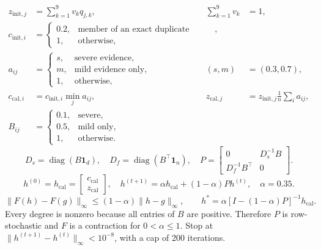 \begin{align}
 z_{\mathrm{init},j} &= \sum_{k=1}^{9}v_k q_{j,k}, &\sum_{k=1}^{9}v_k&=1,\\
 c_{\mathrm{init},i} &= \begin{cases}0.2,&\text{member of an exact duplicate numerical-row group},\\1,&\text{otherwise},\end{cases}\\
 a_{ij} &= \begin{cases}s,&\text{severe evidence},\\m,&\text{mild evidence only},\\1,&\text{otherwise},\end{cases}
 & (s,m)&=(0.3,0.7),\\
 c_{\mathrm{cal},i} &=c_{\mathrm{init},i}\min_j a_{ij},
 & z_{\mathrm{cal},j}&=z_{\mathrm{init},j}\frac{1}{n}\sum_i a_{ij},\\
 B_{ij} &= \begin{cases}0.1,&\text{severe},\\0.5,&\text{mild only},\\1,&\text{otherwise}.\end{cases}
\end{align}
\begin{equation}
D_s=\operatorname{diag}(B\mathbf{1}_d),\quad
D_f=\operatorname{diag}(B^\top\mathbf{1}_n),\quad
P=\begin{bmatrix}0&D_s^{-1}B\\D_f^{-1}B^\top&0\end{bmatrix}.
\end{equation}
\begin{equation}
h^{(0)}=h_{\mathrm{cal}}=\begin{bmatrix}c_{\mathrm{cal}}\\z_{\mathrm{cal}}\end{bmatrix},\quad
h^{(t+1)}=\alpha h_{\mathrm{cal}}+(1-\alpha)Ph^{(t)},\quad\alpha=0.35.
\end{equation}
\begin{equation}
\|F(h)-F(g)\|_\infty\le(1-\alpha)\|h-g\|_\infty,\qquad
h^*=\alpha[I-(1-\alpha)P]^{-1}h_{\mathrm{cal}}.
\end{equation}
Every degree is nonzero because all entries of $B$ are positive. Therefore $P$ is row-stochastic and $F$ is a contraction for $0<\alpha\le1$. Stop at $\|h^{(t+1)}-h^{(t)}\|_\infty<10^{-8}$, with a cap of 200 iterations.
